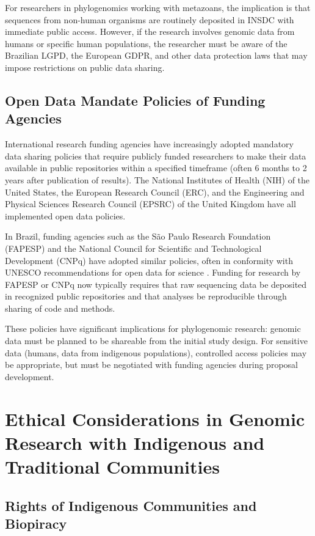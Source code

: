 For researchers in phylogenomics working with metazoans, the implication is that sequences from non-human organisms are routinely deposited in INSDC with immediate public access. However, if the research involves genomic data from humans or specific human populations, the researcher must be aware of the Brazilian LGPD, the European GDPR, and other data protection laws that may impose restrictions on public data sharing.

\subsection{Open Data Mandate Policies of Funding Agencies}

International research funding agencies have increasingly adopted mandatory data sharing policies that require publicly funded researchers to make their data available in public repositories within a specified timeframe (often 6 months to 2 years after publication of results). The National Institutes of Health (NIH) of the United States, the European Research Council (ERC), and the Engineering and Physical Sciences Research Council (EPSRC) of the United Kingdom have all implemented open data policies.

In Brazil, funding agencies such as the São Paulo Research Foundation (FAPESP) and the National Council for Scientific and Technological Development (CNPq) have adopted similar policies, often in conformity with UNESCO recommendations for open data for science \parencite{unesco2021}. Funding for research by FAPESP or CNPq now typically requires that raw sequencing data be deposited in recognized public repositories and that analyses be reproducible through sharing of code and methods.

These policies have significant implications for phylogenomic research: genomic data must be planned to be shareable from the initial study design. For sensitive data (humans, data from indigenous populations), controlled access policies may be appropriate, but must be negotiated with funding agencies during proposal development.

\section{Ethical Considerations in Genomic Research with Indigenous and Traditional Communities}

\subsection{Rights of Indigenous Communities and Biopiracy}

